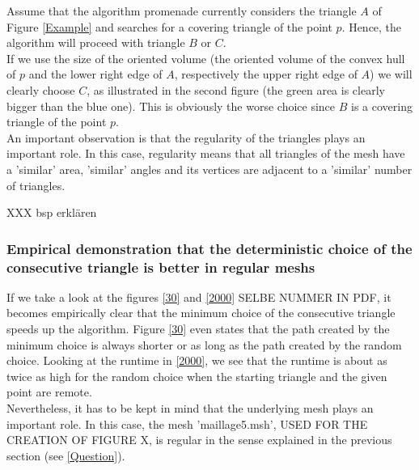 \documentclass[10pt]{article}
\begin{document}
	Assume that the algorithm {\ttfamily promenade} currently considers  the triangle $ A $ of Figure \ref{Example} and searches for a covering triangle of the point $ p $.
	Hence, the algorithm will proceed with triangle $ B $ or $ C $. \\
	 If we use the size of the oriented volume (the oriented volume of the convex hull of $ p $ and the lower right edge of $ A $, respectively the upper right edge of $ A $) we will clearly choose $ C $, as illustrated in the second figure (the green area is clearly bigger than the blue one). This is obviously the worse choice since $ B $ is a covering triangle of the point $ p $.  \\
	 An important observation is that the regularity of the triangles plays an important role. In this case, regularity means that all triangles of the mesh have a 'similar' area, 'similar' angles and its vertices are adjacent to a 'similar' number of triangles.
	 
	 XXX bsp erklären

\subsubsection{Empirical demonstration that the deterministic choice of the consecutive triangle is better in regular meshs}
If we take a look at the figures \ref{30} and \ref{2000} SELBE NUMMER IN PDF, it becomes empirically clear that the minimum choice of the consecutive triangle speeds up the algorithm. Figure \ref{30} even states that the path created by the minimum choice is always shorter or as long as the path created by the random choice. Looking at the runtime in \ref{2000}, we see that the runtime is about as twice as high for the random choice when the starting triangle and the given point are remote. 
 \\
Nevertheless, it has to be kept in mind that the underlying mesh plays an important role.
In this case, the mesh 'maillage5.msh', USED FOR THE CREATION OF FIGURE X, is regular in the sense explained in the previous section (see \ref{Question}).  
\end{document}
